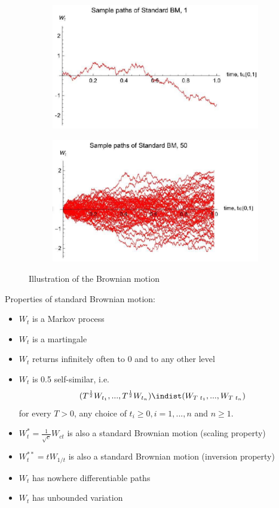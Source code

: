 \documentclass[11pt,a4paper]{book}
\theoremstyle{definition}\newtheorem{definition}{Definition}
\theoremstyle{definition}\newtheorem{fact}{Fact}
\theoremstyle{definition}\newtheorem{remark}{Remark}
\theoremstyle{definition}\newtheorem{ex}{Ex.}
\theoremstyle{definition}\newtheorem{project}{Project}
\theoremstyle{definition}\newtheorem{problem}{Problem}
\theoremstyle{definition}\newtheorem{example}{Example}
\numberwithin{theorem}{section}
\numberwithin{corollary}{chapter}
\numberwithin{assumption}{chapter}
\numberwithin{definition}{chapter}
\numberwithin{prop}{chapter}
\numberwithin{notation}{chapter}
\numberwithin{problem}{chapter}
\numberwithin{example}{chapter}
\numberwithin{fact}{chapter}
\numberwithin{ex}{chapter}
\begin{document}
\begin{figure}[H]
	\begin{subfigure}{0.5\textwidth}
		\centering
		\includegraphics[scale=0.5]{Chapter01/Chapter1_2.png}
	\end{subfigure}
	\begin{subfigure}{0.5\textwidth}
		\centering
		\includegraphics[scale=0.5]{Chapter01/Chapter1_3.png}
	\end{subfigure}
	\caption{Illustration of the Brownian motion}
\end{figure}

Properties of standard Brownian motion:
\begin{itemize}
\item $W_t$ is a Markov process
\item $W_t$ is a martingale
\item $W_t$ returns infinitely often to 0 and to any other level
\item $W_t$ is 0.5 self-similar, i.e.
$$ (T^{\frac{1}{2}} W_{t_1}, ..., T^{\frac{1}{2}} W_{t_n}) \indist (W_{T\,\,t_1}, ..., W_{T\,\,t_n}) $$
for every $T>0$, any choice of $t_i \geq 0, i = 1, ..., n$ and $n \geq 1$.
\item $W_t^* = \frac{1}{\sqrt{c}} W_{ct}$ is also a standard Brownian motion (scaling property)
\item $W_t^{{**}} = t W_{1/t}$ is also a standard Brownian motion (inversion property)
\item $W_t$ has nowhere differentiable paths
\item $W_t$ has unbounded variation
\end{itemize}
\end{document}
